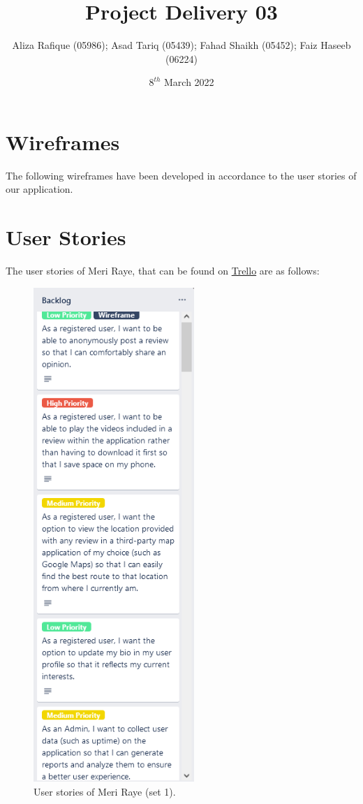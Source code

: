 \documentclass[11pt]{extarticle}
\title{\textbf{Project Delivery 03}}
\author{Aliza Rafique (05986); Asad Tariq (05439); Fahad Shaikh (05452); Faiz Haseeb (06224)}
\date{$8^{th}$ March 2022}
\begin{document}

\newpage
\thispagestyle{empty}
\tableofcontents
\newpage
\pagestyle{plain}

\section{Wireframes}
\justify
The following wireframes have been developed in accordance to the user stories of our application.



\newpage
\section{User Stories}
\justify
The user stories of Meri Raye, that can be found on \href{https://trello.com/b/I4bgtgMu/software-engineering-project}{Trello} are as follows:

\begin{center}
    \begin{figure}[H]
        \centering
        \includegraphics[width=2.4in]{Figures/user_stories_1.png}
        \caption{User stories of Meri Raye (set 1).}
    \end{figure}
\end{center}
\end{document}
